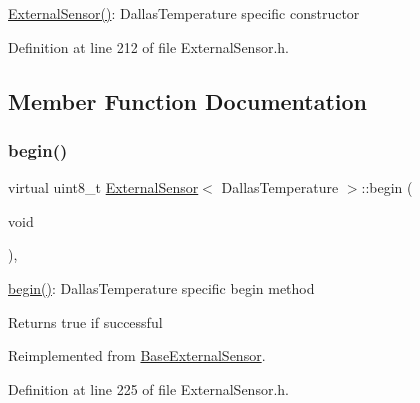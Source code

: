 \hyperlink{class_external_sensor_3_01_dallas_temperature_01_4_ad290681e8780cdf1870416eee99d699d}{External\+Sensor()}\+: Dallas\+Temperature specific constructor 

Definition at line 212 of file External\+Sensor.\+h.



\subsection{Member Function Documentation}
\mbox{\label{class_external_sensor_3_01_dallas_temperature_01_4_ac5275129b05e2ff8df45d5b222a661d9}} 
\subsubsection{\texorpdfstring{begin()}{begin()}}
{\footnotesize\ttfamily virtual uint8\+\_\+t \hyperlink{class_external_sensor}{External\+Sensor}$<$ Dallas\+Temperature $>$\+::begin (\begin{DoxyParamCaption}\item[{void}]{ }\end{DoxyParamCaption})\hspace{0.3cm}{\ttfamily [inline]}, {\ttfamily [virtual]}}

\hyperlink{class_external_sensor_3_01_dallas_temperature_01_4_ac5275129b05e2ff8df45d5b222a661d9}{begin()}\+: Dallas\+Temperature specific begin method

\begin{DoxyReturn}{Returns}
true if successful 
\end{DoxyReturn}


Reimplemented from \hyperlink{class_base_external_sensor_a87d132803d4f4fdd4e66332809f0c9a0}{Base\+External\+Sensor}.



Definition at line 225 of file External\+Sensor.\+h.

\mbox{\label{class_external_sensor_3_01_dallas_temperature_01_4_a127ead06440ec972c22db2abeb8e2b51}} 
